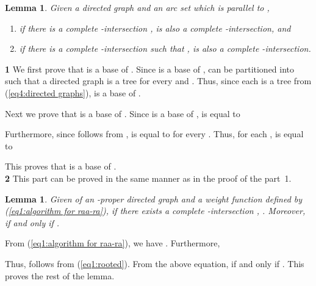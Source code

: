 \documentclass[11pt]{article}
\newcounter{ni}
\theoremstyle{plain}
\newtheorem{lemma}[theorem]{Lemma}\newtheorem{corollary}[theorem]{Corollary}\newtheorem{definition}[theorem]{Definition}\newtheorem{proposition}[theorem]{Proposition}\newtheorem{claim}[theorem]{Claim}\newtheorem{fact}[theorem]{Fact}\newtheorem{example}{Example}
\newcommand{\eop}{\hfill \usebox{\ProofSym}}
\newenvironment{proof}{\noindent {\it Proof.}}{\eop\par\vspace{0.3cm}}
\begin{document}
\begin{lemma} \label{lemma1:wmi}
Given a directed graph   and an arc set  which is parallel to ,
\begin{enumerate}
\item if there is a complete -intersection ,  is also a complete -intersection, and
\item if there is a complete -intersection  such that ,  
is also a complete -intersection.  
\end{enumerate}
\end{lemma}
\begin{proof}
{\bf 1}
We first prove that  is a base of . 
Since  is a base of ,  can be partitioned into 
such that a directed graph  is a tree for every 
 and .
Thus, since each  is a tree from (\ref{eq4:directed graphs}),
 is a base of . 

Next we prove that  is a base of . 
Since  is a base of ,
 is equal to 

Furthermore, since  follows from , 
 is equal to  for every . 
Thus, for each ,  is equal to 

This proves that  is a base of .  
\\
{\bf 2}
This part can be proved in the same manner as in the proof of the part~1.  
\hfill\usebox{\ProofSym}
\end{proof}

\begin{lemma} \label{proposition1:wmi}
Given  of an -proper directed graph 
 and a weight function  
defined by (\ref{eq1:algorithm for raa-ra}),
if there exists a complete -intersection , . 
Moreover,  if and only if . 
\end{lemma}
\begin{proof}
From (\ref{eq1:algorithm for raa-ra}), we have 
.  
Furthermore, 
 
Thus,  follows from (\ref{eq1:rooted}). 
From the above equation,  if and only if . 
This proves the rest of the lemma. 
\hfill\usebox{\ProofSym}
\end{proof}
\end{document}
